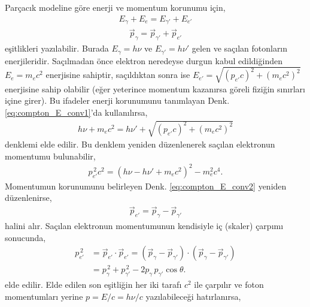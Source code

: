 \documentclass[00_kitap.tex]{subfiles}
\begin{document}
Parçacık modeline göre enerji ve momentum korunumu için,
\begin{align}
\label{eq:compton_E_conv1}
E_\gamma + E_e = E_{\gamma'} + E_{e'}
\end{align}
\begin{align}
\label{eq:compton_E_conv2}
\vec{p}_\gamma = \vec{p}_{\gamma'} + \vec{p}_{e'}
\end{align}
eşitlikleri yazılabilir. Burada $E_{\gamma} = h\nu$ ve $E_{\gamma'} = h\nu'$ gelen ve saçılan fotonların enerjileridir. Saçılmadan önce elektron neredeyse durgun kabul edildiğinden $E_e = m_ec^2$ enerjisine sahiptir, saçıldıktan sonra ise $E_{e'} = \sqrt{(p_{e'}c)^2 + (m_ec^2)^2}$ enerjisine sahip olabilir (eğer yeterince momentum kazanırsa göreli fiziğin sınırları içine girer). Bu ifadeler  enerji korunumunu tanımlayan Denk. \ref{eq:compton_E_conv1}'da kullanılırsa,
\begin{align}
\label{eq:compton_E_conv3}
h\nu + m_e c^2 = h\nu' + \sqrt{(p_{e'}c)^2 + (m_e c^2)^2}
\end{align}
\noindent denklemi elde edilir. Bu denklem yeniden düzenlenerek saçılan elektronun momentumu bulunabilir,
\begin{align}
\label{eq:compton_E_conv4}
p_{e'}^{\, 2}c^2 = (h\nu - h\nu' + m_{e}c^2)^2-m_{e}^2c^4.
\end{align}
Momentumun korunumunu belirleyen Denk. \ref{eq:compton_E_conv2} yeniden düzenlenirse,
\begin{align}
\label{eq:compton_E_conv5}
\vec{p}_{e'} = \vec{p}_\gamma - \vec{p}_{\gamma'}
\end{align}
halini alır. Saçılan elektronun momentumunun kendisiyle iç (skaler) çarpımı sonucunda,
\begin{align}
\label{eq:compton_E_conv6}
p_{e'}^{\, 2} &= \vec{p}_{e'}\cdot\vec{p}_{e'} = (\vec{p}_\gamma - \vec{p}_{\gamma'}) \cdot (\vec{p}_\gamma - \vec{p}_{\gamma'}) \\
&= p_{\gamma}^{\, 2} + p_{\gamma'}^{\, 2} - 2 p_{\gamma}\, p_{\gamma'} \cos\theta. 
\end{align}
elde edilir. Elde edilen son eşitliğin her iki tarafı $c^2$ ile çarpılır ve foton momentumları yerine $p = E/c = h\nu/c$ yazılabileceği hatırlanırsa,
\end{document}
